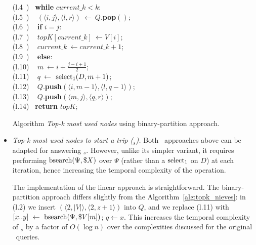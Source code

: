 \begin{itemize}
\begin{algorithm}[ht]
\begin{center}
\begin{minipage}{0.70\textwidth}
\begin{code}
					\>(l.4~) \> ~\textbf{while }$current\_k < k$: \\
					\>(l.5~) \> ~\> $ (\langle i,j\rangle, \langle l,r\rangle) ~\leftarrow ~Q.$\textbf{pop$()$}; \\%
					
					\>(l.6~) \> ~\> \textbf{if} $i = j$: \\
					\>(l.7~) \> ~\> \> $ topK[current\_k] ~\leftarrow V[i]$; \\
					\>(l.8~) \> ~\> \> $ current\_k ~\leftarrow current\_k + 1$; \\
					\>(l.9~) \> ~\> \textbf{else}: \\
					\>(l.10) \> ~\> \> $ m ~\leftarrow i + \frac{j - i + 1}{2}$; \\
					\>(l.11) \> ~\> \> $ q ~\leftarrow$ \textbf{$\operatorname{select}_1(D,m + 1)$}; \\
					\>(l.12) \> ~\> \> $ Q .$\textbf{push$(\langle i, m-1 \rangle, \langle l, q-1 \rangle)$}; \\
					\>(l.13) \> ~\> \> $ Q .$\textbf{push$(\langle m, j \rangle, \langle q, r \rangle)$}; \\%
					\>(l.14) \> ~\textbf{return} $topK$; \\
				\end{code}
			\end{minipage}
		\end{center}
		\caption{Algorithm {\em Top-k most used nodes} using binary-partition approach.}
		\label{alg:topk_nieves}
	\end{algorithm}

	\item {\em Top-k most used nodes to start a trip (\topK$_s$).}
	Both \topK\ approaches above can be adapted for answering \topK$_s$.
	However, unlike its simpler variant, it requires performing $\operatorname{bsearch}(\Psi,\$X)$ over $\Psi$ (rather than a $\operatorname{select}_1$ on $D$) at
	each iteration, hence increasing the temporal complexity of the operation.

	The implementation of the linear approach is straightforward. The binary-partition approach differs slightly 
	from the Algorithm~\ref{alg:topk_nieves}: in (l.2) we insert $(\langle 2, |V| \rangle, \langle 2,z+1 \rangle)$ into $Q$, and we 
	replace (l.11) with $[x..y]~\leftarrow~\operatorname{bsearch}(\Psi,\$V[m])$; $q \leftarrow x$. This increases the temporal complexity of \topK$_s$ by a factor of $O(\log n)$ over the complexities discussed for the original \topK\ queries.
	\end{itemize}

